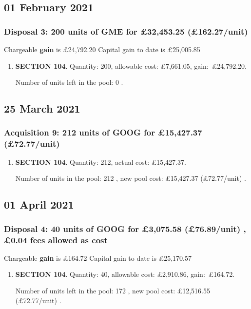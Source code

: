 \documentclass{article}
\begin{document}
\subsection*{01 February 2021}
\subsubsection*{
    Disposal 3: 200 units of GME
for £32,453.25
    (£162.27/unit)%
}
Chargeable \textbf{gain} is £24,792.20
Capital gain to date is £25,005.85

\begin{enumerate}
\item \textbf{SECTION 104}. Quantity: 200,
    allowable
    cost:
    £7,661.05,
    \mbox{gain: £24,792.20.}

    Number of units left in the pool:
    0%
.

\end{enumerate}



\subsection*{25 March 2021}
\subsubsection*{
    Acquisition 9: 212 units of GOOG for £15,427.37
    (£72.77/unit)%
}

\begin{enumerate}
\item \textbf{SECTION 104}. Quantity: 212,
    actual cost: £15,427.37.

    Number of units in the pool:
    212%
,
    new pool cost: £15,427.37
    (£72.77/unit)%
.

\end{enumerate}



\subsection*{01 April 2021}
\subsubsection*{
    Disposal 4: 40 units of GOOG
for £3,075.58
    (£76.89/unit)%
    , £0.04 fees allowed as cost
}
Chargeable \textbf{gain} is £164.72
Capital gain to date is £25,170.57

\begin{enumerate}
\item \textbf{SECTION 104}. Quantity: 40,
    allowable
    cost:
    £2,910.86,
    \mbox{gain: £164.72.}

    Number of units left in the pool:
    172%
,
    new pool cost: £12,516.55
    (£72.77/unit)%
.

\end{enumerate}
\end{document}
